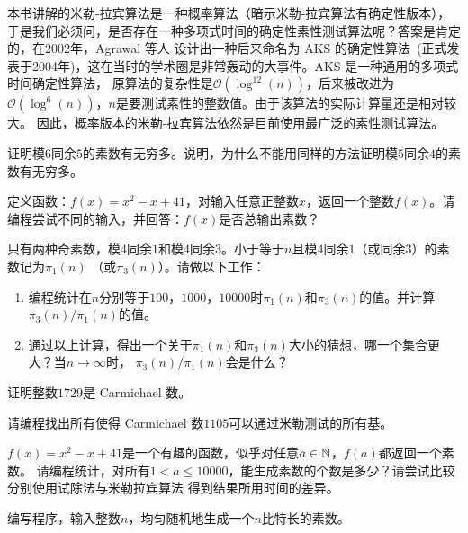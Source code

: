 本书讲解的米勒-拉宾算法是一种概率算法（暗示米勒-拉宾算法有确定性版本），于是我们必须问，是否存在一种多项式时间的确定性素性测试算法呢？答案是肯定的，在2002年，Agrawal 等人
设计出一种后来命名为 AKS 的确定性算法~\cite{AKS04primes}(正式发表于2004年)，这在当时的学术圈是非常轰动的大事件。AKS 是一种通用的多项式时间确定性算法，
原算法的复杂性是$\mathcal{O}(\log^{12}(n))$，后来被改进为$\mathcal{O}(\log^{6}(n))$，$n$是要测试素性的整数值。由于该算法的实际计算量还是相对较大。
因此，概率版本的米勒-拉宾算法依然是目前使用最广泛的素性测试算法。


\begin{problemset}
\item 证明模$6$同余$5$的素数有无穷多。说明，为什么不能用同样的方法证明模$5$同余$4$的素数有无穷多。

\item 定义函数：$f(x) = x^2 - x + 41$，对输入任意正整数$x$，返回一个整数$f(x)$。请编程尝试不同的输入，并回答：$f(x)$是否总输出素数？%

\item 只有两种奇素数，模$4$同余$1$和模$4$同余$3$。小于等于$n$且模$4$同余$1$（或同余$3$）的素数记为$\pi_1(n)$
（或$\pi_3(n)$）。请做以下工作：
\begin{enumerate}
\item 编程统计在$n$分别等于$100$，$1000$，$10000$时$\pi_1(n)$和$\pi_3(n)$的值。并计算$\pi_3(n)/\pi_1(n)$的值。

\item 通过以上计算，得出一个关于$\pi_1(n)$和$\pi_3(n)$大小的猜想，哪一个集合更大？当$n \rightarrow \infty$时，
$\pi_3(n)/\pi_1(n)$会是什么？
\end{enumerate}

\item 证明整数$1729$是 Carmichael 数。%

\item 请编程找出所有使得 Carmichael 数$1105$可以通过米勒测试的所有基。

\item $f(x) = x^2 - x + 41$是一个有趣的函数，似乎对任意$a \in {\mathbb N}$，$f(a)$都返回一个素数。
请编程统计，对所有$1 <  a \leq 10000$，能生成素数的个数是多少？请尝试比较分别使用试除法与米勒拉宾算法
得到结果所用时间的差异。

\item 编写程序，输入整数$n$，均匀随机地生成一个$n$比特长的素数。
\end{problemset}
